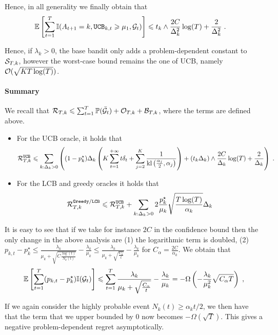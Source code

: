 Hence, in all generality we finally obtain that 
\begin{align*}
\mathbb{E}\left[\sum_{t=1}^T \mathbb{I}(A_{t+1}=k, \texttt{UCB}_{k, t}\geqslant \mu_1, \mathcal{G}_t)\right] &\leqslant t_k \wedge  \frac{2C}{\Delta_k^2}\log(T) + \frac{2}{\Delta_k^2} \;.
\end{align*}

Hence, if $\lambda_k>0$, the base bandit only adds a problem-dependent constant to $\mathcal{S}_{T,k}$, however the worst-case bound remains the one of UCB, namely $\mathcal{O}(\sqrt{KT\log(T)})$.

\paragraph{Summary} We recall that $\mathcal{R}_{T,k}\leqslant \sum_{t=1}^T \mathbb{P}(\bar {\mathcal{G}}_t)+\mathcal{O}_{T, k}+ \mathcal{B}_{T,k}$, where the terms are defined above. 
\begin{itemize}
	\item For the UCB oracle, it holds that 
	\[\mathcal{R}_{T,k}^\text{\texttt{UCB}} \leqslant \sum_{k: \Delta_k>0}\left((1-p_k^\star)\Delta_k \left(K \sum_{t=1}^{+\infty} t\delta_t + \sum_{j=2}^K\frac{1}{\text{\normalfont kl}\left(\frac{\alpha_j}{2}, \alpha_j\right)}\right) + (t_k\Delta_k) \wedge  \frac{2C}{\Delta_k}\log(T) + \frac{2}{\Delta_k} \right) \;. \]
	\item For the LCB and greedy oracles it holds that 
	\[ \mathcal{R}_{T,k}^{\texttt{Greedy}/\texttt{LCB}} \leqslant \mathcal{R}_{T,k}^{\texttt{UCB}} + \sum_{k:\Delta_k>0} 2\frac{p_k^\star}{\mu_k}\sqrt{\frac{T\log(T)}{\alpha_k}} \Delta_k
	\]
\end{itemize}



\begin{remark} 
	
	It is easy to see that if we take for instance $2C$ in the confidence bound then the only change in the above analysis are (1) the logarithmic term is doubled, (2) $p_{k, t}-p_k^\star\leq \frac{\lambda_k}{\mu_k+\sqrt{C\frac{\log(t)}{N_k(t)}}}-\frac{\lambda_k}{\mu_k}\leq \frac{\lambda_k}{\mu_k+\sqrt{\frac{C_\alpha}{t}}}-\frac{\lambda_k}{\mu_k}$ for $C_\alpha=\frac{2C}{\alpha_k}$. We obtain that
	\[\mathbb{E}\left[\sum_{t=1}^T(p_{k,t}-p_k^\star)\mathbb{I}(\mathcal{G}_t)\right] \leqslant \sum_{t=1}^T \frac{\lambda_k}{\mu_k+\sqrt{\frac{C_\alpha}{t}}}-\frac{\lambda_k}{\mu_k} = -\Omega\left(-\frac{\lambda_k}{\mu_k^2}\sqrt{C_\alpha T}\right)\;,
	\]
	
	If we again consider the highly probable event $N_k(t)\geq \alpha_k t/2$, we then have that the term that we upper bounded by $0$ now becomes $-\Omega(\sqrt{T})$. This gives a negative problem-dependent regret asymptotically.
\end{remark}


